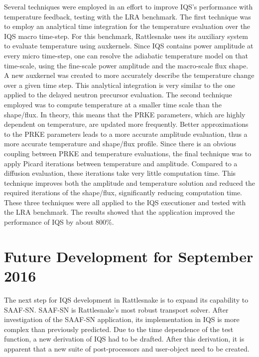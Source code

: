 \documentclass[11pt]{scrartcl}
\begin{document}
Several techniques were employed in an effort to improve IQS's performance with temperature feedback, testing with the LRA benchmark. The first technique was to employ an analytical time integration for the temperature evaluation over the IQS macro time-step.  For this benchmark, Rattlesnake uses its auxiliary system to evaluate temperature using auxkernels.  Since IQS contains power amplitude at every micro time-step, one can resolve the adiabatic temperature model on that time-scale, using the fine-scale power amplitude and the macro-scale flux shape. A new auxkernel was created to more accurately describe the temperature change over a given time step.  This analytical integration is very similar to the one applied to the delayed neutron precursor evaluation.  The second technique employed was to compute temperature at a smaller time scale than the shape/flux.  In theory, this means that the PRKE parameters, which are highly dependent on temperature, are updated more frequently.  Better approximations to the PRKE parameters leads to a more accurate amplitude evaluation, thus a more accurate temperature and shape/flux profile.  Since there is an obvious coupling between PRKE and temperature evaluations, the final technique was to apply Picard iterations between temperature and amplitude.  Compared to a diffusion evaluation, these iterations take very little computation time.  This technique improves both the amplitude and temperature solution and reduced the required iterations of the shape/flux, significantly reducing computation time.  These three techniques were all applied to the IQS executioner and tested with the LRA benchmark.  The results showed that the application improved the performance of IQS by about 800\%.

\section*{\large Future Development for September 2016}

The next step for IQS development in Rattlesnake is to expand its capability to SAAF-SN.  SAAF-SN is Rattlesnake's most robust transport solver. After investigation of the SAAF-SN application, its implementation in IQS is more complex than previously predicted. Due to the time dependence of the test function, a new derivation of IQS had to be drafted.  After this derivation, it is apparent that a new suite of post-processors and user-object need to be created.
\\
\end{document}
